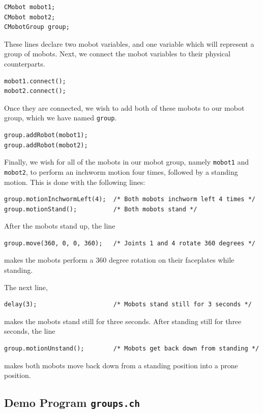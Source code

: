 \documentclass{article}
\begin{document}
\begin{verbatim}
CMobot mobot1;
CMobot mobot2;
CMobotGroup group;
\end{verbatim}

These lines declare two mobot variables, and one variable which
will represent a group of mobots. Next, we connect the mobot
variables to their physical counterparts.

\begin{verbatim}
mobot1.connect();
mobot2.connect();
\end{verbatim}

Once they are connected, we wish to add both of these mobots to our mobot group,
which we have named \texttt{group}.

\begin{verbatim}
group.addRobot(mobot1);
group.addRobot(mobot2);
\end{verbatim}

Finally, we wish for all of the mobots in our mobot group, namely
\texttt{mobot1} and \texttt{mobot2}, to perform an inchworm motion four times, followed
by a standing motion. This is done with the following lines:

\begin{verbatim}
group.motionInchwormLeft(4);  /* Both mobots inchworm left 4 times */
group.motionStand();          /* Both mobots stand */
\end{verbatim}

After the mobots stand up, the line
\begin{verbatim}
group.move(360, 0, 0, 360);   /* Joints 1 and 4 rotate 360 degrees */
\end{verbatim}
makes the mobots perform a 360 degree rotation on their faceplates
while standing.

The next line, 
\begin{verbatim}
delay(3);                     /* Mobots stand still for 3 seconds */
\end{verbatim}
makes the mobots stand still for three seconds. After standing
still for three seconds, the line
\begin{verbatim}
group.motionUnstand();        /* Mobots get back down from standing */
\end{verbatim}
makes both mobots move back down from a standing position into a prone
position.

\subsection{Demo Program \texttt{groups.ch}}
\end{document}
